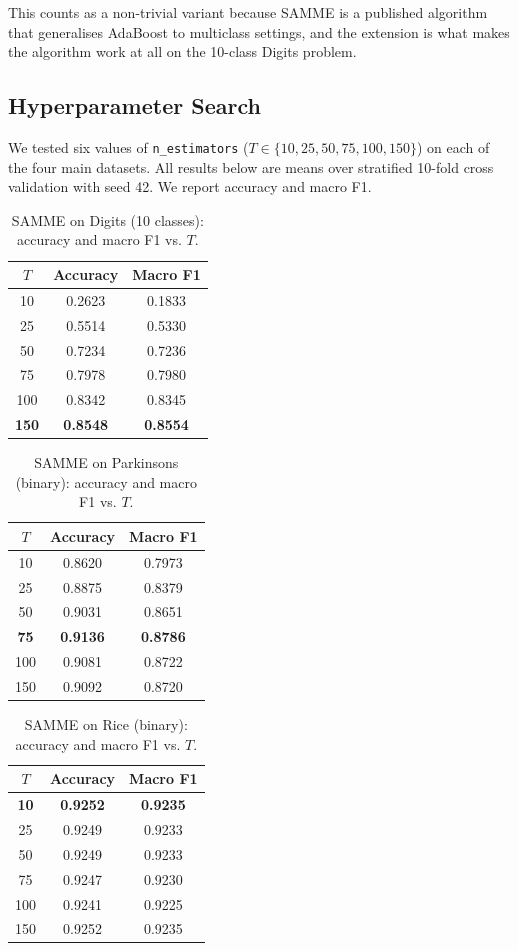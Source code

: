 \documentclass[11pt,letterpaper]{article}
\begin{document}
This counts as a non-trivial variant because SAMME is a published algorithm
that generalises AdaBoost to multiclass settings, and the extension is what
makes the algorithm work at all on the 10-class Digits problem.

\subsection{Hyperparameter Search}

We tested six values of \texttt{n\_estimators} ($T \in \{10, 25, 50, 75, 100, 150\}$)
on each of the four main datasets. All results below are means over stratified
10-fold cross validation with seed 42. We report accuracy and macro F1.

\begin{table}[h]
\centering
\caption{SAMME on Digits (10 classes): accuracy and macro F1 vs. $T$.}
\begin{tabular}{ccc}
\hline
$T$ & Accuracy & Macro F1 \\
\hline
10  & 0.2623 & 0.1833 \\
25  & 0.5514 & 0.5330 \\
50  & 0.7234 & 0.7236 \\
75  & 0.7978 & 0.7980 \\
100 & 0.8342 & 0.8345 \\
\rowcolor{gray!25}
\textbf{150} & \textbf{0.8548} & \textbf{0.8554} \\
\hline
\end{tabular}
\end{table}

\begin{table}[h]
\centering
\caption{SAMME on Parkinsons (binary): accuracy and macro F1 vs. $T$.}
\begin{tabular}{ccc}
\hline
$T$ & Accuracy & Macro F1 \\
\hline
10  & 0.8620 & 0.7973 \\
25  & 0.8875 & 0.8379 \\
50  & 0.9031 & 0.8651 \\
\rowcolor{gray!25}
\textbf{75}  & \textbf{0.9136} & \textbf{0.8786} \\
100 & 0.9081 & 0.8722 \\
150 & 0.9092 & 0.8720 \\
\hline
\end{tabular}
\end{table}

\begin{table}[h]
\centering
\caption{SAMME on Rice (binary): accuracy and macro F1 vs. $T$.}
\begin{tabular}{ccc}
\hline
$T$ & Accuracy & Macro F1 \\
\hline
\rowcolor{gray!25}
\textbf{10}  & \textbf{0.9252} & \textbf{0.9235} \\
25  & 0.9249 & 0.9233 \\
50  & 0.9249 & 0.9233 \\
75  & 0.9247 & 0.9230 \\
100 & 0.9241 & 0.9225 \\
150 & 0.9252 & 0.9235 \\
\hline
\end{tabular}
\end{table}
\end{document}
